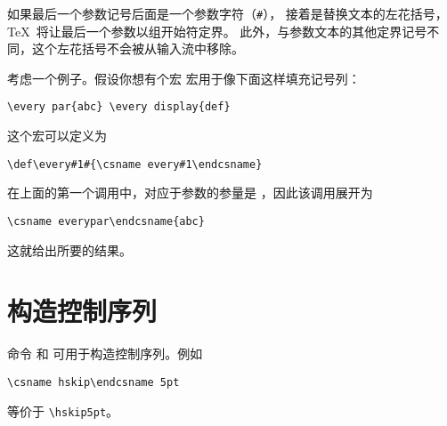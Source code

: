\documentclass[letterpaper]{book}
\begin{document}
如果最后一个参数记号后面是一个参数字符（\verb>#>），
接着是替换文本的左花括号，\TeX\ 将让最后一个参数以组开始符定界。
此外，与参数文本的其他定界记号不同，这个左花括号不会被从输入流中移除。

考虑一个例子。假设你想有个宏  宏用于像下面这样填充记号列：
\begin{verbatim}
\every par{abc} \every display{def}
\end{verbatim}
这个宏可以定义为
\begin{verbatim}
\def\every#1#{\csname every#1\endcsname}
\end{verbatim}
在上面的第一个调用中，对应于参数的参量是 ，因此该调用展开为
\begin{verbatim}
\csname everypar\endcsname{abc}
\end{verbatim}
这就给出所要的结果。


\section{构造控制序列}
\label{cs:name}

命令  和  可用于构造控制序列。例如
\begin{verbatim}
\csname hskip\endcsname 5pt
\end{verbatim}
等价于 \verb=\hskip5pt=。
\end{document}
